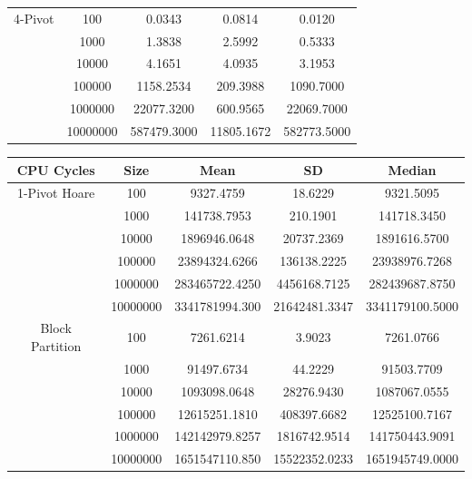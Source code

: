 \documentclass{article}
\begin{document}
\begin{center}
\begin{tabular}{ |c c | c c c| }
        \hline
        4-Pivot         & 100      & 0.0343         & 0.0814        & 0.0120 \\
                        & 1000     & 1.3838         & 2.5992        & 0.5333 \\
                        & 10000    & 4.1651         & 4.0935        & 3.1953 \\
                        & 100000   & 1158.2534      & 209.3988      & 1090.7000 \\
                        & 1000000  & 22077.3200     & 600.9565      & 22069.7000 \\
                        & 10000000 & 587479.3000    & 11805.1672    & 582773.5000 \\
        \hline
    \end{tabular}

    \small
    \begin{tabular}{ |c c | c c c| }
        \hline
        CPU Cycles      & Size     & Mean           & SD            & Median \\
        \hline
        1-Pivot Hoare   & 100      & 9327.4759      & 18.6229       & 9321.5095 \\
                        & 1000     & 141738.7953    & 210.1901      & 141718.3450 \\
                        & 10000    & 1896946.0648   & 20737.2369    & 1891616.5700 \\
                        & 100000   & 23894324.6266  & 136138.2225   & 23938976.7268 \\
                        & 1000000  & 283465722.4250 & 4456168.7125  & 282439687.8750 \\
                        & 10000000 & 3341781994.300 & 21642481.3347 & 3341179100.5000 \\
        Block Partition & 100      & 7261.6214      & 3.9023        & 7261.0766 \\
                        & 1000     & 91497.6734     & 44.2229       & 91503.7709 \\
                        & 10000    & 1093098.0648   & 28276.9430    & 1087067.0555 \\
                        & 100000   & 12615251.1810  & 408397.6682   & 12525100.7167 \\
                        & 1000000  & 142142979.8257 & 1816742.9514  & 141750443.9091 \\
                        & 10000000 & 1651547110.850 & 15522352.0233 & 1651945749.0000 \\

\end{tabular}
\end{center}
\end{document}
